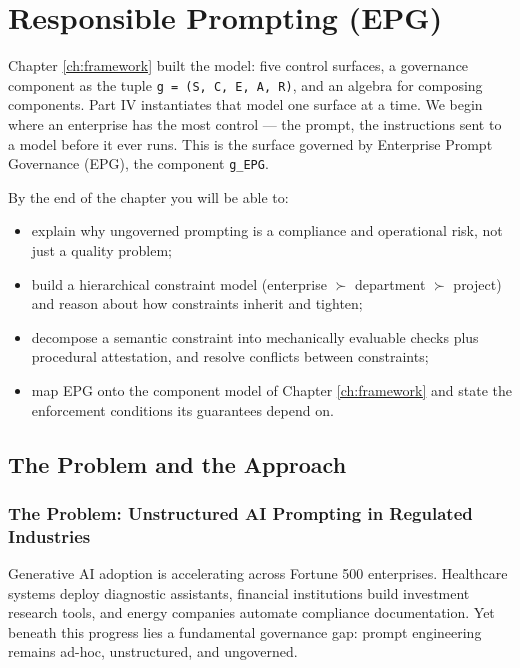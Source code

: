\chapter{Responsible Prompting (EPG)}
\label{ch:prompt}


Chapter \ref{ch:framework} built the model: five control surfaces, a governance component as the tuple \texttt{g = (S, C, E, A, R)}, and an algebra for composing components. Part IV instantiates that model one surface at a time. We begin where an enterprise has the most control --- the prompt, the instructions sent to a model before it ever runs. This is the surface governed by Enterprise Prompt Governance (EPG), the component \texttt{g\_\allowbreak{}EPG}.

By the end of the chapter you will be able to:

\begin{itemize}
  \item explain why ungoverned prompting is a compliance and operational risk, not just a quality problem;
  \item build a hierarchical constraint model (enterprise $\succ$ department $\succ$ project) and reason about how constraints inherit and tighten;
  \item decompose a semantic constraint into mechanically evaluable checks plus procedural attestation, and resolve conflicts between constraints;
  \item map EPG onto the component model of Chapter \ref{ch:framework} and state the enforcement conditions its guarantees depend on.
\end{itemize}


\section{The Problem and the Approach}
\label{sec:prompt-1}


\subsection{The Problem: Unstructured AI Prompting in Regulated Industries}


Generative AI adoption is accelerating across Fortune 500 enterprises. Healthcare systems deploy diagnostic assistants, financial institutions build investment research tools, and energy companies automate compliance documentation. Yet beneath this progress lies a fundamental governance gap: prompt engineering remains ad-hoc, unstructured, and ungoverned.

